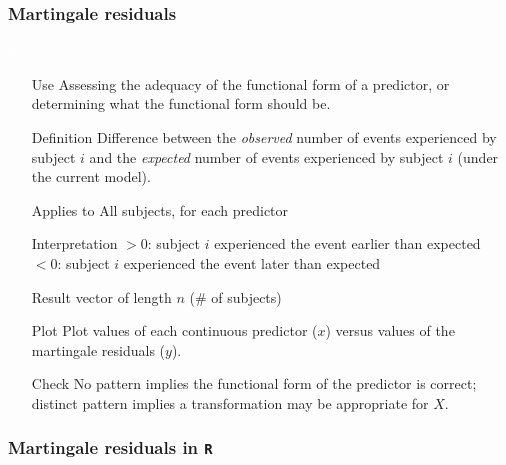 \begin{frame}
\frametitle{Martingale residuals}
\hspace*{-0.3in}
\begin{minipage}{0.12\textwidth}
\textcolor{white}{w}
\end{minipage}
\begin{minipage}{0.91\textwidth}
\small{
\begin{itemize}
\item[Use] Assessing the adequacy of the functional form of a predictor, or determining what the functional form should be.
\item[Definition] Difference between the \textit{observed} number of events experienced by subject $i$ and the \textit{expected} number of events experienced by subject $i$ (under
the current model).
\item[Applies to] All subjects, for each predictor
\item[Interpretation] $>0$: subject $i$ experienced the event earlier than expected \\
                      $<0$: subject $i$ experienced the event later than expected
\item[Result] vector of length $n$ (\# of subjects)
\item[Plot] Plot values of each continuous predictor ($x$) versus values of the martingale residuals ($y$).
\item[Check] No pattern implies the functional form of the predictor is correct; distinct pattern implies a transformation may be appropriate for $X$.
\end{itemize}}
\end{minipage}
\end{frame}

\begin{frame}[fragile]
\frametitle{Martingale residuals in \texttt{R}}
\end{frame}

